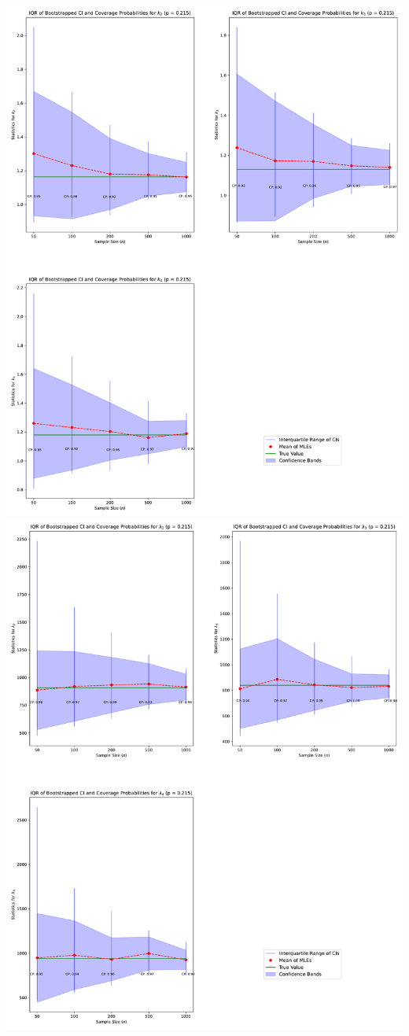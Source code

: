 \documentclass{article}
\begin{document}
\centering
\includegraphics[width=.475\textwidth]{plot-n-vs-stats-p215-shape.pdf}
\includegraphics[width=.475\textwidth]{plot-n-vs-stats-p215-scale.pdf}
\end{document}
